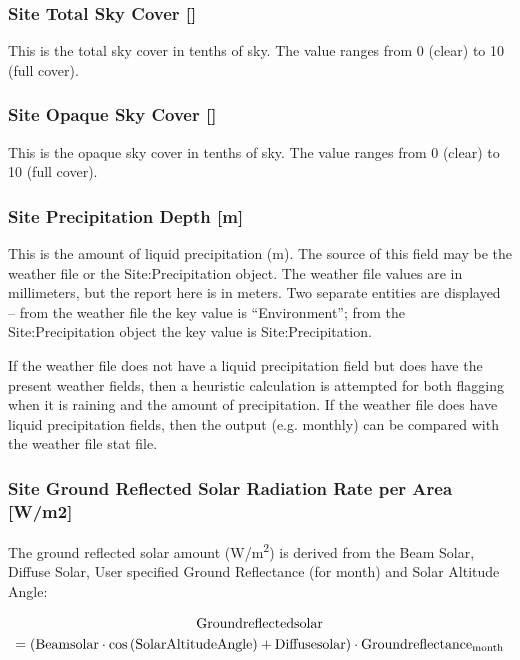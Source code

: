 \subsubsection{Site Total Sky Cover {[]}}\label{site-total-sky-cover}

This is the total sky cover in tenths of sky. The value ranges from 0 (clear) to 10 (full cover).

\subsubsection{Site Opaque Sky Cover {[]}}\label{site-opaque-sky-cover}

This is the opaque sky cover in tenths of sky. The value ranges from 0 (clear) to 10 (full cover).

\subsubsection{Site Precipitation Depth {[}m{]}}\label{site-precipitation-depth-m}

This is the amount of liquid precipitation (m). The source of this field may be the weather file or the Site:Precipitation object. The weather file values are in millimeters, but the report here is in meters. Two separate entities are displayed -- from the weather file the key value is ``Environment''; from the Site:Precipitation object the key value is Site:Precipitation.

If the weather file does not have a liquid precipitation field but does have the present weather fields, then a heuristic calculation is attempted for both flagging when it is raining and the amount of precipitation. If the weather file does have liquid precipitation fields, then the output (e.g. monthly) can be compared with the weather file stat file.

\subsubsection{Site Ground Reflected Solar Radiation Rate per Area {[}W/m2{]}}\label{site-ground-reflected-solar-radiation-rate-per-area-wm2}

The ground reflected solar amount (\si{W/m^2}) is derived from the Beam Solar, Diffuse Solar, User specified Ground Reflectance (for month) and Solar Altitude Angle:

\begin{multline}
  \rm{Groundreflectedsolar}
  \\
  = \left( \rm{Beamsolar} \cdot cos \left( \rm{SolarAltitudeAngle} \right) + \rm{Diffusesolar} \right) \cdot \rm{Groundreflectance}_{\rm{month}}
\end{multline}

